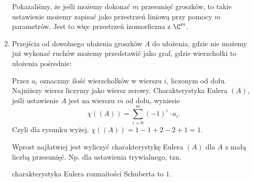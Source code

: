 \begin{enumerate}[label=\textbf{(\alph*)}]
    Pokazaliśmy, że jeśli możemy dokonać $m$ przesunięć groszków, to takie ustawienie możemy zapisać jako przestrzeń liniową przy pomocy $m$ parametrów. Jest to więc przestrzeń izomorficzna z $\C^m$.

  \item Przejścia od dowolnego ułożenia groszków $A$ do ułożenia, gdzie nie możemy już wykonać ruchów możemy przedstawić jako graf, gdzie wierzchołki to ułożenia pośrednie:
    \begin{center}\end{center}

    Przez $a_i$ oznaczmy ilość wierzchołków w wierszu $i$, liczonym od dołu. Najniższy wiersz liczymy jako wiersz zerowy. Charakterystyka Eulera $(A)$, jeśli ustawienie $A$ jest na wierszu $m$ od dołu, wyniesie
    $$\chi((A))=\sum_{i=0}^{m}(-1)^i\cdot a_i.$$
    Czyli dla rysunku wyżej, $\chi((A))=1-1+2-2+1=1$.

    Wprost najłatwiej jest wyliczyć charakterystykę Eulera $(A)$ dla $A$ z małą liczbą przesunięć. Np. dla ustawienia trywialnego, tzn. 
    \begin{center}\end{center} 
    charakterystyka Eulera rozmaitości Schuberta to $1$.


\end{enumerate}
